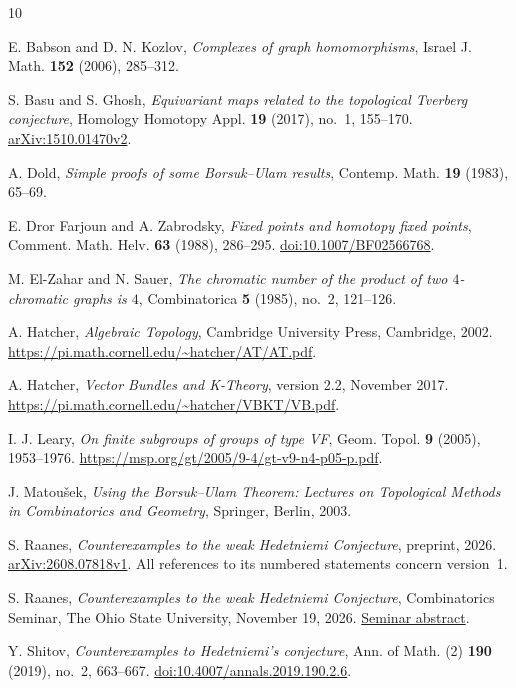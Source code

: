 \documentclass[11pt]{amsart}
\theoremstyle{definition}
\theoremstyle{remark}
\numberwithin{equation}{section}
\begin{document}
\begin{thebibliography}{10}

E. Babson and D. N. Kozlov,
\emph{Complexes of graph homomorphisms},
Israel J. Math. \textbf{152} (2006), 285--312.

S. Basu and S. Ghosh,
\emph{Equivariant maps related to the topological Tverberg conjecture},
Homology Homotopy Appl. \textbf{19} (2017), no.~1, 155--170.
\href{https://arxiv.org/abs/1510.01470v2}{arXiv:1510.01470v2}.

A. Dold,
\emph{Simple proofs of some Borsuk--Ulam results},
Contemp. Math. \textbf{19} (1983), 65--69.

E. Dror Farjoun and A. Zabrodsky,
\emph{Fixed points and homotopy fixed points},
Comment. Math. Helv. \textbf{63} (1988), 286--295.
\href{https://doi.org/10.1007/BF02566768}{doi:10.1007/BF02566768}.

M. El-Zahar and N. Sauer,
\emph{The chromatic number of the product of two $4$-chromatic graphs is $4$},
Combinatorica \textbf{5} (1985), no.~2, 121--126.

A. Hatcher,
\emph{Algebraic Topology},
Cambridge University Press, Cambridge, 2002.
\url{https://pi.math.cornell.edu/~hatcher/AT/AT.pdf}.

A. Hatcher,
\emph{Vector Bundles and K-Theory},
version 2.2, November 2017.
\url{https://pi.math.cornell.edu/~hatcher/VBKT/VB.pdf}.

I. J. Leary,
\emph{On finite subgroups of groups of type VF},
Geom. Topol. \textbf{9} (2005), 1953--1976.
\url{https://msp.org/gt/2005/9-4/gt-v9-n4-p05-p.pdf}.

J. Matou\v{s}ek,
\emph{Using the Borsuk--Ulam Theorem: Lectures on Topological Methods in Combinatorics and Geometry},
Springer, Berlin, 2003.

S. Raanes,
\emph{Counterexamples to the weak Hedetniemi Conjecture},
preprint, 2026.
\href{https://arxiv.org/abs/2608.07818v1}{arXiv:2608.07818v1}.
All references to its numbered statements concern version~1.

S. Raanes,
\emph{Counterexamples to the weak Hedetniemi Conjecture},
Combinatorics Seminar, The Ohio State University, November 19, 2026.
\href{https://math.osu.edu/events/combinatorics-seminar-steven-raanes}{Seminar abstract}.

Y. Shitov,
\emph{Counterexamples to Hedetniemi's conjecture},
Ann. of Math. (2) \textbf{190} (2019), no.~2, 663--667.
\href{https://doi.org/10.4007/annals.2019.190.2.6}{doi:10.4007/annals.2019.190.2.6}.


\end{thebibliography}
\end{document}

